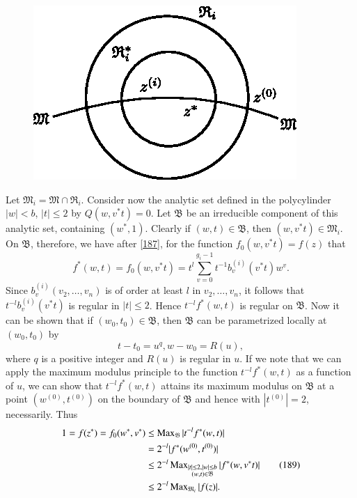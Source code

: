 \begin{figure}[H]
\centering
\includegraphics{figure3.eps}
\end{figure}

Let $\mathfrak{M}_{i}=\mathfrak{M}\cap \mathfrak{R}_{i}$. Consider now
the analytic set defined in the polycylinder $|w|<b$, $|t|\leq 2$ by
$Q(w,v^{\ast}t)=0$. Let $\mathfrak{B}$ be an irreducible component of
this analytic set, containing $(w^{\ast},1)$. Clearly if
$(w,t)\in\mathfrak{B}$, then $(w,v^{\ast}t)\in\mathfrak{M}_{i}$. On
$\mathfrak{B}$, therefore, we have after \eqref{187}, for the function
$f_{0}(w,v^{\ast}t)=f(z)$ that
$$
f^{\ast}(w,t)=f_{0}(w,v^{\ast}t)=t^{l}\sum^{g_{i}-1}_{v=0}t^{-1}b^{(i)}_{v}(v^{\ast}t)w^{v}. 
$$\pageoriginale
Since $b^{(i)}_{v}(v_{2},\ldots,v_{n})$ is of order at least $l$ in
$v_{2},\ldots,v_{n}$, it follows that $t^{-l}b^{(i)}_{v}(v^{\ast}t)$
is regular in $|t|\leq 2$. Hence $t^{-l}f^{\ast}(w,t)$ is regular on
$\mathfrak{B}$. Now it can be shown that if
$(w_{0},t_{0})\in\mathfrak{B}$, then $\mathfrak{B}$ can be
parametrized locally at $(w_{0},t_{0})$ by
$$
t-t_{0}=u^{q}, w-w_{0}=R(u),
$$
where $q$ is a positive integer and $R(u)$ is regular in $u$. If we
note that we can apply the maximum modulus principle to the function
$t^{-l}f^{\ast}(w,t)$ as a function of $u$, we can show that
$t^{-l}f^{\ast}(w,t)$ attains its maximum modulus on $\mathfrak{B}$ at
a point $(w^{(0)},t^{(0)})$ on the boundary of $\mathfrak{B}$ and
hence with $|t^{(0)}|=2$, necessarily. Thus
\begin{align*}
1=f(z^{\ast})=f_{0}(w^{\ast},v^{\ast}) &\leq
\operatorname{Max}\limits_{\mathfrak{B}}|t^{-l}f^{\ast}(w,t)|\\
&= 2^{-l}|f^{\ast}(w^{(0)},t^{(0)})|\\
&\leq 2^{-l}\operatorname{Max}\limits_{\substack{|t|\leq 2,|w|\leq
    b\\ (w,t)\in\mathfrak{B}}}|f^{\ast}(w,v^{\ast}t)|\tag{189}\label{189}\\
&\leq 2^{-l}\operatorname{Max}\limits_{\mathfrak{M}_{i}}|f(z)|.
\end{align*}


